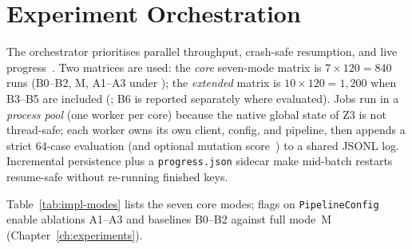 \section{Experiment Orchestration}
\label{sec:impl:orchestration}

The orchestrator prioritises parallel throughput, crash-safe resumption, and
live progress~\citep{harman2004maff,beck2004xp}.
Two matrices are used: the \emph{core} seven-mode matrix is
$7 \times 120 = 840$ runs (B0--B2, M, A1--A3 under
); the \emph{extended} matrix is
$10 \times 120 = 1{,}200$ when B3--B5 are included
(; B6 is reported separately where evaluated).
Jobs run in a \emph{process pool} (one worker per core) because the native
global state of Z3 is not thread-safe; each worker owns its own client, config, and
pipeline, then appends a strict 64-case evaluation (and optional mutation
score~\citep{demillo1978mutation,li2023iet_faultprevention}) to a shared JSONL log.
Incremental persistence plus a \texttt{progress.json} sidecar make mid-batch
restarts resume-safe without re-running finished keys.

Table~\ref{tab:impl-modes} lists the seven core modes; flags on
\texttt{PipelineConfig} enable ablations A1--A3 and baselines B0--B2 against
full mode~M (Chapter~\ref{ch:experiments}).

